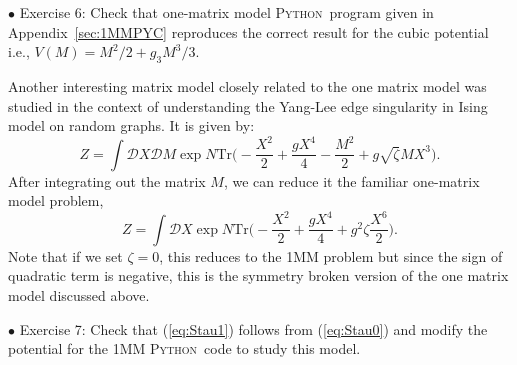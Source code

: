 \documentclass[letter,11pt]{article}
\newcommand{\PY}{\textsc{Python}}
\begin{document}
\begin{mdframed}[backgroundcolor=blue!3] 
	$\bullet$ Exercise 6:  Check that one-matrix model \PY~program given in Appendix~\ref{sec:1MMPYC} reproduces the correct result for the cubic potential 
	i.e., $V(M) = M^2/2 + g_{3}M^3/3$.  
	\label{ex:6} 
\end{mdframed} 
Another interesting matrix model closely related to the one matrix model was 
studied in the context of understanding the Yang-Lee edge singularity
\cite{Staudacher:1989fy} in Ising model on random graphs. 
It is given by: 
\begin{equation}
	\label{eq:Stau0}
	Z = \int \mathcal{D}X \mathcal{D}M \exp N \mbox{Tr}\Bigg(-\frac{X^2}{2} + \frac{gX^4}{4} - \frac{M^2}{2} + g \sqrt{\zeta} MX^3 \Bigg).
\end{equation}
After integrating out the matrix $M$, we can reduce it the familiar one-matrix model problem, 
\begin{equation}
	\label{eq:Stau1} 
	Z = \int \mathcal{D}X \exp N \mbox{Tr}\Bigg(-\frac{X^2}{2} + \frac{gX^4}{4} + g^2 \zeta  \frac{X^6}{2}   \Bigg).
\end{equation}
Note that if we set $\zeta=0$, this reduces to the 1MM problem but since the sign of 
quadratic term is negative, this is the symmetry broken version of the one matrix model 
discussed above. 
\begin{mdframed}[backgroundcolor=blue!3]  
	$\bullet$ Exercise 7: Check that (\ref{eq:Stau1}) follows from (\ref{eq:Stau0}) and modify the potential for the 1MM \PY~code to study this model. 
\end{mdframed} 
\end{document}

